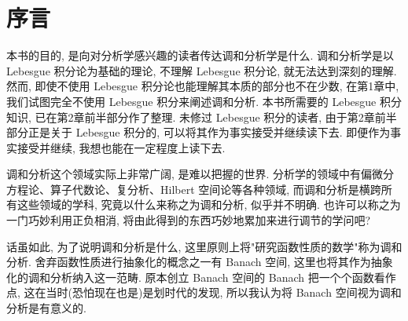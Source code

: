 \chapter*{序言}

本书的目的, 是向对分析学感兴趣的读者传达调和分析学是什么. 调和分析学是以 Lebesgue 积分论为基础的理论, 不理解 Lebesgue 积分论, 就无法达到深刻的理解. 然而, 即使不使用 Lebesgue 积分论也能理解其本质的部分也不在少数, 在第1章中, 我们试图完全不使用 Lebesgue 积分来阐述调和分析. 本书所需要的 Lebesgue 积分知识, 已在第2章前半部分作了整理. 未修过 Lebesgue 积分的读者, 由于第2章前半部分正是关于 Lebesgue 积分的, 可以将其作为事实接受并继续读下去. 即便作为事实接受并继续, 我想也能在一定程度上读下去.

调和分析这个领域实际上非常广阔, 是难以把握的世界. 分析学的领域中有偏微分方程论、算子代数论、复分析、Hilbert 空间论等各种领域, 而调和分析是横跨所有这些领域的学科, 究竟以什么来称之为调和分析, 似乎并不明确. 也许可以称之为一门巧妙利用正负相消, 将由此得到的东西巧妙地累加来进行调节的学问吧?

话虽如此, 为了说明调和分析是什么, 这里原则上将"研究函数性质的数学"称为调和分析. 舍弃函数性质进行抽象化的概念之一有 Banach 空间, 这里也将其作为抽象化的调和分析纳入这一范畴. 原本创立 Banach 空间的 Banach 把一个个函数看作点, 这在当时(恐怕现在也是)是划时代的发现, 所以我认为将 Banach 空间视为调和分析是有意义的.

